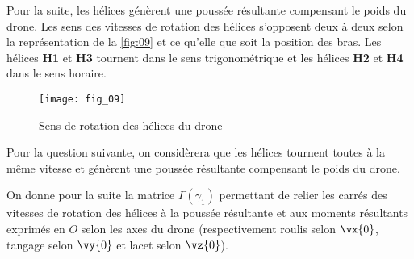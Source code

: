 Pour la suite, les hélices génèrent une poussée résultante compensant le poids du drone.
Les sens des vitesses de rotation des hélices s’opposent deux à deux selon la représentation
de la \autoref{fig:09} et ce qu’elle que soit la position des bras. Les hélices \textbf{H1} et \textbf{H3} tournent dans
le sens trigonométrique et les hélices \textbf{H2} et \textbf{H4} dans le sens horaire.

\begin{figure}[H]
\centering
\texttt{[image: fig\_09]}
\caption{\label{fig:09} ­Sens de rotation des hélices du drone}
\end{figure}

\ifprof
\begin{corrige}

\end{corrige}
\else
\fi
Pour la question suivante, on considèrera que les hélices tournent toutes à la même vitesse
et génèrent une poussée résultante compensant le poids du drone.

\ifprof
\begin{corrige}
\end{corrige}
\else
\fi

On donne pour la suite la matrice $\Gamma (\gamma_1)$ permettant de relier les carrés des vitesses de rotation
des hélices à la poussée résultante et aux moments résultants exprimés en $O$ selon les axes
du drone (respectivement roulis selon $\vx{0}$, tangage selon $\vy{0}$ et lacet selon $\vz{0}$).

